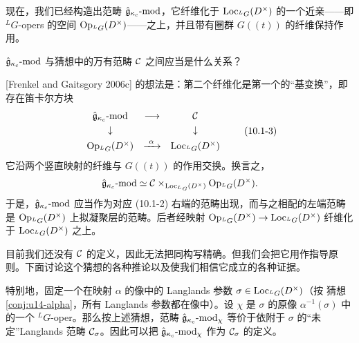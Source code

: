 现在，我们已经构造出范畴 $\hat{\mathfrak{g}}_{\kappa_c}\text{-}\mathrm{mod}$，它纤维化于 $\operatorname{Loc}_{{}^L G}(D^\times)$ 的一个近亲——即 ${}^L G$-opers 的空间 $\operatorname{Op}_{{}^L G}(D^\times)$——之上，并且带有圈群 $G((t))$ 的纤维保持作用。

$\hat{\mathfrak{g}}_{\kappa_c}\text{-}\mathrm{mod}$ 与猜想中的万有范畴 $\mathcal{C}$ 之间应当是什么关系？

[Frenkel and Gaitsgory 2006c] 的想法是：第二个纤维化是第一个的“基变换”，即存在笛卡尔方块
\begin{equation}
\begin{array}{ccc}
    \hat{\mathfrak{g}}_{\kappa_c}\text{-}\mathrm{mod} & \longrightarrow & \mathcal{C}\\[3pt]
    \downarrow & & \downarrow\\[3pt]
    \operatorname{Op}_{{}^L G}(D^\times) & \xrightarrow{\ \alpha\ } & \operatorname{Loc}_{{}^L G}(D^\times)
\end{array}
    \tag{10.1-3}
\end{equation}
它沿两个竖直映射的纤维与 $G((t))$ 的作用交换。换言之，
\[
    \hat{\mathfrak{g}}_{\kappa_c}\text{-}\mathrm{mod}
    \simeq\mathcal{C}\times_{\operatorname{Loc}_{{}^L G}(D^\times)}\operatorname{Op}_{{}^L G}(D^\times).
\]
于是，$\hat{\mathfrak{g}}_{\kappa_c}\text{-}\mathrm{mod}$ 应当作为对应 (10.1-2) 右端的范畴出现，而与之相配的左端范畴是 $\operatorname{Op}_{{}^L G}(D^\times)$ 上拟凝聚层的范畴。后者经映射 $\operatorname{Op}_{{}^L G}(D^\times)\to\operatorname{Loc}_{{}^L G}(D^\times)$ 纤维化于 $\operatorname{Loc}_{{}^L G}(D^\times)$ 之上。

目前我们还没有 $\mathcal{C}$ 的定义，因此无法把同构写精确。但我们会把它用作指导原则。下面讨论这个猜想的各种推论以及使我们相信它成立的各种证据。

特别地，固定一个在映射 $\alpha$ 的像中的 Langlands 参数 $\sigma\in\operatorname{Loc}_{{}^L G}(D^\times)$（按 猜想 \ref{conj:u14-alpha}，所有 Langlands 参数都在像中）。设 $\chi$ 是 $\sigma$ 的原像 $\alpha^{-1}(\sigma)$ 中的一个 ${}^L G$-oper。那么按上述猜想，范畴 $\hat{\mathfrak{g}}_{\kappa_c}\text{-}\mathrm{mod}_\chi$ 等价于依附于 $\sigma$ 的“未定”Langlands 范畴 $\mathcal{C}_\sigma$。因此可以把 $\hat{\mathfrak{g}}_{\kappa_c}\text{-}\mathrm{mod}_\chi$ 作为 $\mathcal{C}_\sigma$ 的定义。

